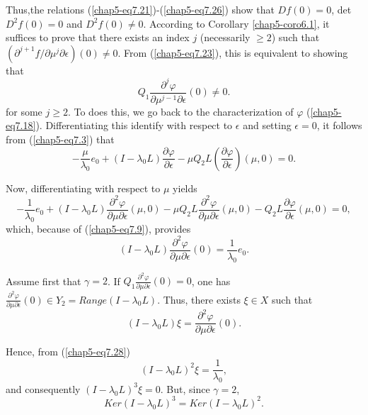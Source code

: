 Thus,\pageoriginale the relations
(\ref{chap5-eq7.21})-(\ref{chap5-eq7.26}) show that $Df(0) = 0$, det
$D^{2}f(0) = 0$ and $D^{2}f(0) \neq 0$. According to Corollary
\ref{chap5-coro6.1}, it suffices to prove that there exists an index $j$
(necessarily $\geq 2$) such that $(\partial^{j+1} f/\partial \mu^{j}
\partial \epsilon)(0) \neq 0$. From (\ref{chap5-eq7.23}), this is
equivalent to showing that
$$
Q_{1} \frac{\partial^{j} \varphi}{\partial \mu^{j-1} \partial
  \epsilon} (0) \neq 0.
$$
for some $j \geq 2$. To does this, we go back to the characterization
of $\varphi$ (\ref{chap5-eq7.18}). Differentiating this identify with
respect to $\epsilon$ and setting $\epsilon = 0$, it follows from
(\ref{chap5-eq7.3}) that
$$
- \frac{\mu}{\lambda_{0}} e_{0} + (I - \lambda_{0}L) \frac{\partial
  \varphi}{\partial \epsilon} - \mu Q_{2}L \left(\frac{\partial
  \varphi}{\partial \epsilon}\right) (\mu, 0) = 0.
$$

Now, differentiating with respect to $\mu$ yields
\begin{equation*}
- \frac{1}{\lambda_{0}} e_{0} + (I - \lambda_{0}L)
\frac{\partial^{2}\varphi}{\partial \mu \partial \epsilon} (\mu, 0) -
\mu Q_{2}L \frac{\partial^{2} \varphi}{\partial \mu \partial \epsilon}
(\mu, 0) - Q_{2}L \frac{\partial \varphi}{\partial \epsilon} (\mu, 0)
= 0,\tag{7.27}\label{chap5-eq7.27}
\end{equation*}
which, because of (\ref{chap5-eq7.9}), provides
\begin{equation*}
(I - \lambda_{0}L) \frac{\partial^{2} \varphi}{\partial \mu \partial
    \epsilon} (0) = \frac{1}{\lambda_{0}} e_{0}.\tag{7.28}\label{chap5-eq7.28}
\end{equation*}

Assume first that $\gamma = 2$. If $Q_{1} \frac{\partial^{2}
  \varphi}{\partial \mu \partial \epsilon} (0) = 0$, one has
$\frac{\partial^{2} \varphi}{\partial \mu \partial \epsilon} (0)
\in Y_{2} = Range (I - \lambda_{0}L)$. Thus, there exists $\xi
\in X$ such that 
\begin{equation*}
(I - \lambda_{0}L) \xi = \frac{\partial^{2} \varphi}{\partial \mu
    \partial \epsilon} (0).\tag{7.29}\label{chap5-eq7.29}
\end{equation*}

Hence, from (\ref{chap5-eq7.28})
\begin{equation*}
(I - \lambda_{0}L)^{2} \xi =
  \frac{1}{\lambda_{0}},\tag{7.30}\label{chap5-eq7.30} 
\end{equation*}
and consequently $(I - \lambda_{0}L)^{3} \xi = 0$. But, since $\gamma
= 2$,
$$
Ker (I - \lambda_{0}L)^{3} = Ker(I - \lambda_{0}L)^{2}.
$$

